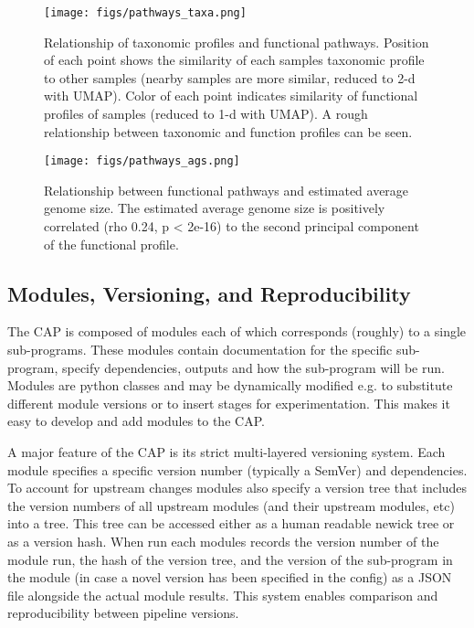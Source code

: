\begin{figure}
  \begin{center}
    \texttt{[image: figs/pathways\_taxa.png]}
	\caption{\small{
	    Relationship of taxonomic profiles and functional pathways. Position of each point shows the similarity of each samples taxonomic profile to other samples (nearby samples are more similar, reduced to 2-d with UMAP). Color of each point indicates similarity of functional profiles of samples (reduced to 1-d with UMAP). A rough relationship between taxonomic and function profiles can be seen.
	}}
    \label{fig:taxa}
  \end{center}
\end{figure}

\begin{figure}
  \begin{center}
    \texttt{[image: figs/pathways\_ags.png]}
	\caption{\small{
	    Relationship between functional pathways and estimated average genome size. The estimated average genome size is positively correlated (rho 0.24, p < 2e-16) to the second principal component of the functional profile.
	}}
    \label{fig:ags}
  \end{center}
\end{figure}

\subsection{Modules, Versioning, and Reproducibility}

The CAP is composed of modules each of which corresponds (roughly) to a single sub-programs. These modules contain documentation for the specific sub-program, specify dependencies, outputs and how the sub-program will be run. Modules are python classes and may be dynamically modified e.g. to substitute different module versions or to insert stages for experimentation. This makes it easy to develop and add modules to the CAP.

A major feature of the CAP is its strict multi-layered versioning system. Each module specifies a specific version number (typically a SemVer) and dependencies. To account for upstream changes modules also specify a version tree that includes the version numbers of all upstream modules (and their upstream modules, etc) into a tree. This tree can be accessed either as a human readable newick tree or as a version hash. When run each modules records the version number of the module run, the hash of the version tree, and the version of the sub-program in the module (in case a novel version has been specified in the config) as a JSON file alongside the actual module results. This system enables comparison and reproducibility between pipeline versions.

